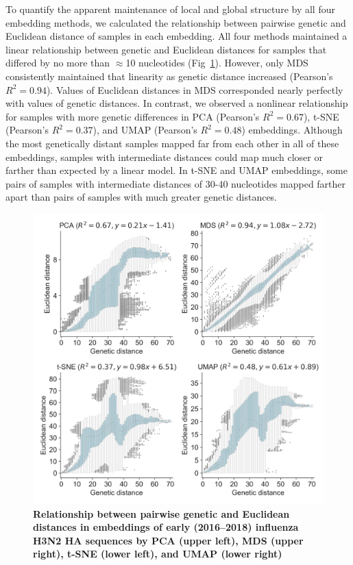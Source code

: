 \documentclass[10pt,letterpaper]{article}
\begin{document}
To quantify the apparent maintenance of local and global structure by all four embedding methods, we calculated the relationship between pairwise genetic and Euclidean distance of samples in each embedding.
All four methods maintained a linear relationship between genetic and Euclidean distances for samples that differed by no more than $\approx$10 nucleotides (Fig~\ref{fig:seasonal-influenza-h3n2-ha-pairwise-distances}).
However, only MDS consistently maintained that linearity as genetic distance increased (Pearson's $R^{2} = 0.94$).
Values of Euclidean distances in MDS corresponded nearly perfectly with values of genetic distances.
In contrast, we observed a nonlinear relationship for samples with more genetic differences in PCA (Pearson's $R^{2} = 0.67$), t-SNE (Pearson's $R^{2} = 0.37$), and UMAP (Pearson's $R^{2} = 0.48$) embeddings.
Although the most genetically distant samples mapped far from each other in all of these embeddings, samples with intermediate distances could map much closer or farther than expected by a linear model.
In t-SNE and UMAP embeddings, some pairs of samples with intermediate distances of 30-40 nucleotides mapped farther apart than pairs of samples with much greater genetic distances.

\begin{figure}[!h]
\includegraphics[width=\columnwidth]{figures/flu-2016-2018-ha-euclidean-distance-by-genetic-distance.png}
\caption{{\bf Relationship between pairwise genetic and Euclidean distances in embeddings of early (2016--2018) influenza H3N2 HA sequences by PCA (upper left), MDS (upper right), t-SNE (lower left), and UMAP (lower right)}}
\label{fig:seasonal-influenza-h3n2-ha-pairwise-distances}
\end{figure}
\end{document}
